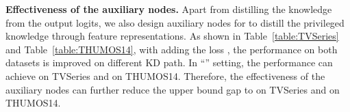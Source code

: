 \documentclass[final]{cvpr}
\begin{document}
\begin{table}[t]
\centering
\caption{Comparisons in terms of mAP (\%) on the THUMOS14 dataset. The first two rows show the baseline performance on the online and different offline models. Rest of the table illustrate the effectiveness of different KD paths and KD losses for model .}
\label{table:THUMOS14}
\end{table}



\noindent \textbf{Effectiveness of the auxiliary nodes.} Apart from distilling the knowledge from the output logits, we also design auxiliary nodes for  to distill the privileged knowledge through feature representations. As shown in Table~\ref{table:TVSeries} and Table~\ref{table:THUMOS14}, with adding the loss , the performance on both datasets is improved on different KD path. In ``'' setting, the performance can achieve  on TVSeries and  on THUMOS14. Therefore, the effectiveness of the auxiliary nodes can further reduce the upper bound gap to  on TVSeries and  on THUMOS14. 
\end{document}
